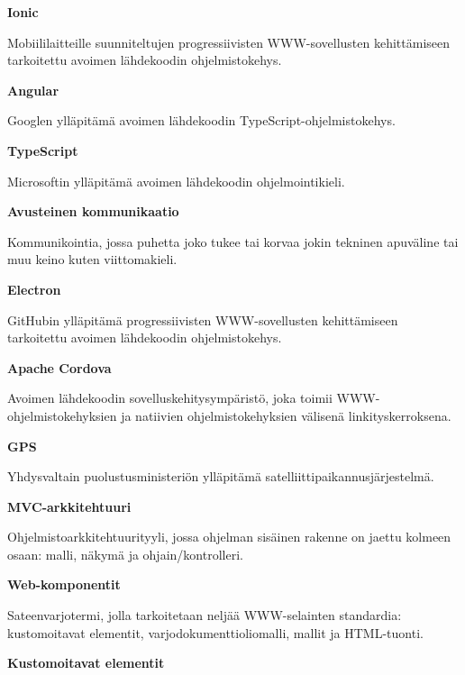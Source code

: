 \documentclass[utf8]{gradu3}
\begin{document}
\begin{thetermlist}
\item[\textbf{Ionic}] 

Mobiililaitteille suunniteltujen progressiivisten WWW\nobreakdash-\hspace{0pt}sovellusten kehittämiseen tarkoitettu avoimen lähdekoodin ohjelmistokehys.

\item[\textbf{Angular}] 

Googlen ylläpitämä avoimen lähdekoodin TypeScript\nobreakdash-\hspace{0pt}ohjelmistokehys.

\item[\textbf{TypeScript}] 

Microsoftin ylläpitämä avoimen lähdekoodin ohjelmointikieli.

\item[\textbf{Avusteinen kommunikaatio}]

Kommunikointia, jossa puhetta joko tukee tai korvaa jokin tekninen apuväline tai muu keino kuten viittomakieli.

\item[\textbf{Electron}] 

GitHubin ylläpitämä progressiivisten WWW-sovellusten kehittämiseen tarkoitettu avoimen lähdekoodin ohjelmistokehys.

\item[\textbf{Apache Cordova}] 

Avoimen lähdekoodin sovelluskehitysympäristö, joka toimii \linebreak[4]WWW-ohjelmistokehyksien ja natiivien ohjelmistokehyksien välisenä linkityskerroksena.

\item[\textbf{GPS}] 

Yhdysvaltain puolustusministeriön ylläpitämä satelliittipaikannusjärjestelmä.

\item[\textbf{MVC-arkkitehtuuri}] 

Ohjelmistoarkkitehtuurityyli, jossa ohjelman sisäinen rakenne on jaettu kolmeen osaan: malli, näkymä ja ohjain/kontrolleri.

\item[\textbf{Web-komponentit}] 

Sateenvarjotermi, jolla tarkoitetaan neljää WWW-selainten standardia: kustomoitavat elementit, varjodokumenttioliomalli, mallit ja HTML-tuonti.

\item[\textbf{Kustomoitavat elementit}] 


\end{thetermlist}
\end{document}

